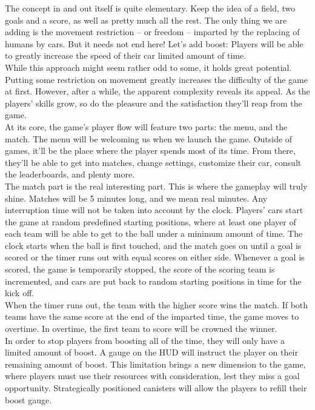 The concept in and out itself is quite elementary. Keep the idea of a field, two goals and a score, as well as pretty much all the rest. The only thing we are adding is the movement restriction – or freedom – imparted by the replacing of humans by cars. But it needs not end here! Let’s add boost: Players will be able to greatly increase the speed of their car limited amount of time.\\

While this approach might seem rather odd to some, it holds great potential. Putting some restriction on movement greatly increases the difficulty of the game at first. However, after a while, the apparent complexity reveals its appeal. As the players’ skills grow, so do the pleasure and the satisfaction they’ll reap from the game.\\

At its core, the game’s player flow will feature two parts: the menu, and the match. The menu will be welcoming us when we launch the game. Outside of games, it’ll be the place where the player spends most of its time. From there, they’ll be able to get into matches, change settings, customize their car, consult the leaderboards, and plenty more.\\

The match part is the real interesting part. This is where the gameplay will truly shine. Matches will be 5 minutes long, and we mean real minutes. Any interruption time will not be taken into account by the clock. Players’ cars start the game at random predefined starting positions, where at least one player of each team will be able to get to the ball under a minimum amount of time. The clock starts when the ball is first touched, and the match goes on until a goal is scored or the timer runs out with equal scores on either side. Whenever a goal is scored, the game is temporarily stopped, the score of the scoring team is incremented, and cars are put back to random starting positions in time for the kick off.\\

When the timer runs out, the team with the higher score wins the match. If both teams have the same score at the end of the imparted time, the game moves to overtime. In overtime, the first team to score will be crowned the winner. \\

In order to stop players from boosting all of the time, they will only have a limited amount of boost. A gauge on the HUD will instruct the player on their remaining amount of boost. This limitation brings a new dimension to the game, where players must use their resources with consideration, lest they miss a goal opportunity. Strategically positioned canisters will allow the players to refill their boost gauge.\\

